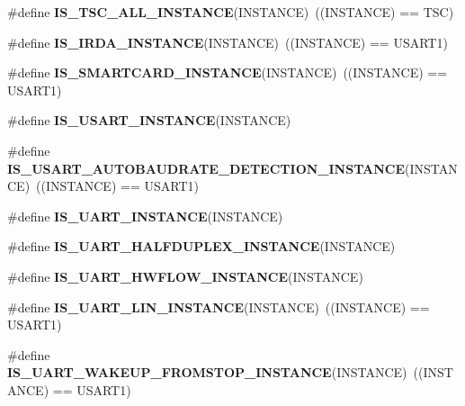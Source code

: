 \begin{DoxyCompactItemize}
\#define {\bfseries I\+S\+\_\+\+T\+S\+C\+\_\+\+A\+L\+L\+\_\+\+I\+N\+S\+T\+A\+N\+CE}(I\+N\+S\+T\+A\+N\+CE)~((I\+N\+S\+T\+A\+N\+CE) == T\+SC)
\item 
\mbox{\label{group___exported__macro_ga98ae6698dc54d8441fce553a65bf5429}} 
\#define {\bfseries I\+S\+\_\+\+I\+R\+D\+A\+\_\+\+I\+N\+S\+T\+A\+N\+CE}(I\+N\+S\+T\+A\+N\+CE)~((I\+N\+S\+T\+A\+N\+CE) == U\+S\+A\+R\+T1)
\item 
\mbox{\label{group___exported__macro_gab2734c105403831749ccb34eeb058988}} 
\#define {\bfseries I\+S\+\_\+\+S\+M\+A\+R\+T\+C\+A\+R\+D\+\_\+\+I\+N\+S\+T\+A\+N\+CE}(I\+N\+S\+T\+A\+N\+CE)~((I\+N\+S\+T\+A\+N\+CE) == U\+S\+A\+R\+T1)
\item 
\#define {\bfseries I\+S\+\_\+\+U\+S\+A\+R\+T\+\_\+\+I\+N\+S\+T\+A\+N\+CE}(I\+N\+S\+T\+A\+N\+CE)
\item 
\mbox{\label{group___exported__macro_ga4130cef42f8cada5a91c38b85f76939e}} 
\#define {\bfseries I\+S\+\_\+\+U\+S\+A\+R\+T\+\_\+\+A\+U\+T\+O\+B\+A\+U\+D\+R\+A\+T\+E\+\_\+\+D\+E\+T\+E\+C\+T\+I\+O\+N\+\_\+\+I\+N\+S\+T\+A\+N\+CE}(I\+N\+S\+T\+A\+N\+CE)~((I\+N\+S\+T\+A\+N\+CE) == U\+S\+A\+R\+T1)
\item 
\#define {\bfseries I\+S\+\_\+\+U\+A\+R\+T\+\_\+\+I\+N\+S\+T\+A\+N\+CE}(I\+N\+S\+T\+A\+N\+CE)
\item 
\#define {\bfseries I\+S\+\_\+\+U\+A\+R\+T\+\_\+\+H\+A\+L\+F\+D\+U\+P\+L\+E\+X\+\_\+\+I\+N\+S\+T\+A\+N\+CE}(I\+N\+S\+T\+A\+N\+CE)
\item 
\#define {\bfseries I\+S\+\_\+\+U\+A\+R\+T\+\_\+\+H\+W\+F\+L\+O\+W\+\_\+\+I\+N\+S\+T\+A\+N\+CE}(I\+N\+S\+T\+A\+N\+CE)
\item 
\mbox{\label{group___exported__macro_ga7d2763df993c77cfa6e249ec7bc80482}} 
\#define {\bfseries I\+S\+\_\+\+U\+A\+R\+T\+\_\+\+L\+I\+N\+\_\+\+I\+N\+S\+T\+A\+N\+CE}(I\+N\+S\+T\+A\+N\+CE)~((I\+N\+S\+T\+A\+N\+CE) == U\+S\+A\+R\+T1)
\item 
\mbox{\label{group___exported__macro_ga6303097822ab1977cc83f05319a10f1e}} 
\#define {\bfseries I\+S\+\_\+\+U\+A\+R\+T\+\_\+\+W\+A\+K\+E\+U\+P\+\_\+\+F\+R\+O\+M\+S\+T\+O\+P\+\_\+\+I\+N\+S\+T\+A\+N\+CE}(I\+N\+S\+T\+A\+N\+CE)~((I\+N\+S\+T\+A\+N\+CE) == U\+S\+A\+R\+T1)
\item 

\end{DoxyCompactItemize}

